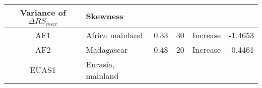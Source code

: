 \documentclass[]{article}
\begin{document}
\begin{longtable}[]{@{}clrccr@{}}
\begin{minipage}[b]{0.16\columnwidth}
Variance of \(\Delta RS_{max}\)\strut
\end{minipage} & \begin{minipage}[b]{0.09\columnwidth}\raggedleft\strut
Skewness\strut
\end{minipage}\tabularnewline
\midrule
\endhead
\begin{minipage}[t]{0.08\columnwidth}\centering\strut
AF1\strut
\end{minipage} & \begin{minipage}[t]{0.29\columnwidth}\raggedright\strut
Africa mainland\strut
\end{minipage} & \begin{minipage}[t]{0.11\columnwidth}\raggedleft\strut
0.33\strut
\end{minipage} & \begin{minipage}[t]{0.10\columnwidth}\centering\strut
30\strut
\end{minipage} & \begin{minipage}[t]{0.16\columnwidth}\centering\strut
Increase\strut
\end{minipage} & \begin{minipage}[t]{0.09\columnwidth}\raggedleft\strut
-1.4653\strut
\end{minipage}\tabularnewline
\begin{minipage}[t]{0.08\columnwidth}\centering\strut
AF2\strut
\end{minipage} & \begin{minipage}[t]{0.29\columnwidth}\raggedright\strut
Madagascar\strut
\end{minipage} & \begin{minipage}[t]{0.11\columnwidth}\raggedleft\strut
0.48\strut
\end{minipage} & \begin{minipage}[t]{0.10\columnwidth}\centering\strut
20\strut
\end{minipage} & \begin{minipage}[t]{0.16\columnwidth}\centering\strut
Increase\strut
\end{minipage} & \begin{minipage}[t]{0.09\columnwidth}\raggedleft\strut
-0.4461\strut
\end{minipage}\tabularnewline
\begin{minipage}[t]{0.08\columnwidth}\centering\strut
EUAS1\strut
\end{minipage} & \begin{minipage}[t]{0.29\columnwidth}\raggedright\strut
Eurasia, mainland\strut
\end{minipage} & \begin{minipage}[t]{0.11\columnwidth}\raggedleft\strut

\end{minipage}
\end{longtable}
\end{document}
